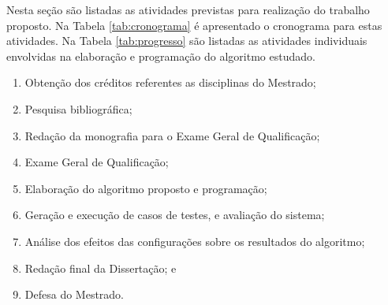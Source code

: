 \documentclass[12pt]{article}
\begin{document}
Nesta seção são listadas as atividades previstas para realização do trabalho proposto.
Na Tabela \ref{tab:cronograma} é apresentado o cronograma para estas atividades.
Na Tabela \ref{tab:progresso} são listadas as atividades individuais envolvidas na elaboração
e programação do algoritmo estudado.

\begin{enumerate}
	\item Obtenção dos créditos referentes as disciplinas do Mestrado;
	\item Pesquisa bibliográfica;
	\item Redação da monografia para o Exame Geral de Qualificação;
	\item Exame Geral de Qualificação;
	\item Elaboração do algoritmo proposto e programação;
	\item Geração e execução de casos de testes, e avaliação do sistema;
	\item Análise dos efeitos das configurações sobre os resultados do algoritmo;
	\item Redação final da Dissertação; e
	\item Defesa do Mestrado.
\end{enumerate}
\end{document}
